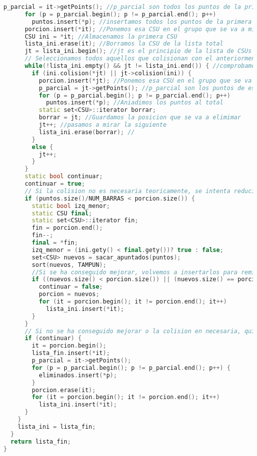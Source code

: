 \begin{lstlisting}[language=C++, numbers=none,basicstyle=\ttfamily\footnotesize,
                   caption={Código de la función que reduce las colisiones
                   aleatorias},]
      p_parcial = it->getPoints(); //p_parcial son todos los puntos de la primera CSU
      for (p = p_parcial.begin(); p != p_parcial.end(); p++)
        puntos.insert(*p); //insertamos todos los puntos de la primera CSU en los totales
      porcion.insert(*it); //Ponemos esa CSU en el grupo que se va a mirar
      CSU ini = *it; //Almacenamos la primera CSU
      lista_ini.erase(it); //Borramos la CSU de la lista total
      jt = lista_ini.begin(); //jt es el principio de la lista de CSUs
      // Seleccionamos todos aquellos que colisionan con el anteriormente seleccionado
      while(!lista_ini.empty() && jt != lista_ini.end()) { //comprobamos cada uno con el primero de la lista
        if (ini.colision(*jt) || jt->colision(ini)) {
          porcion.insert(*jt); //Ponemos esa CSU en el grupo que se va a mirar
          p_parcial = jt->getPoints(); //p_parcial son los puntos de esa CSU
          for (p = p_parcial.begin(); p != p_parcial.end(); p++) 
            puntos.insert(*p); //Aniadimos los puntos al total
          static set<CSU>::iterator borrar;
          borrar = jt; //Guardamos la posicion que se va a elimimar
          jt++; //pasamos a mirar la siguiente
          lista_ini.erase(borrar); //
        }
        else {
          jt++;
        }
      }
      static bool continuar;
      continuar = true;
      // Si la colision no es necesaria teoricamente, se intenta reducir
      if (puntos.size()/NUM_BARRAS < porcion.size()) {
        static bool izq_menor;
        static CSU final;
        static set<CSU>::iterator fin;
        fin = porcion.end();
        fin--;
        final = *fin;
        izq_menor = (ini.gety() < final.gety())? true : false;
        set<CSU> nuevos = sacar_apuntados(puntos);
        sort(nuevos, TAMPUN);
        //Si se ha conseguido mejorar, volvemos a insertarlos para remirarlos
        if ((nuevos.size() < porcion.size()) || (nuevos.size() == porcion.size() && nuevos.begin()->size() > porcion.begin()->size())) {
          continuar = false;
          porcion = nuevos;
          for (it = porcion.begin(); it != porcion.end(); it++)
            lista_ini.insert(*it);
        }
      }
      // Si no se ha conseguido mejorar o la colision en necesaria, quitamos la primera CSU
      if (continuar) {
        it = porcion.begin();
        lista_fin.insert(*it);
        p_parcial = it->getPoints();
        for (p = p_parcial.begin(); p != p_parcial.end(); p++) {
          eliminados.insert(*p);
        }
        porcion.erase(it);
        for (it = porcion.begin(); it != porcion.end(); it++)
          lista_ini.insert(*it);
      }
    }
    lista_ini = lista_fin;
  }
  return lista_fin;
}

\end{lstlisting}

